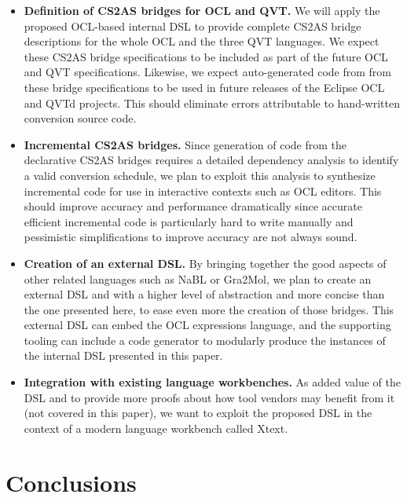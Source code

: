 \documentclass{llncs}
\begin{document}
\begin{itemize}
\item \textbf{Definition of CS2AS bridges for OCL and QVT.} We will apply the proposed OCL-based internal DSL to provide complete CS2AS bridge descriptions for the whole OCL and the three QVT languages. We expect these CS2AS bridge specifications to be included as part of the future OCL and QVT specifications. Likewise, we expect auto-generated code from from these bridge specifications to be used in future releases of the Eclipse OCL and QVTd projects. This should eliminate errors attributable to hand-written conversion source code.

\item \textbf{Incremental CS2AS bridges.} Since generation of code from the declarative CS2AS bridges requires a detailed dependency analysis to identify a valid conversion schedule, we plan to exploit this analysis to synthesize incremental code for use in interactive contexts such as OCL editors. This should improve accuracy and performance dramatically since accurate efficient incremental code is particularly hard to write manually and pessimistic simplifications to improve accuracy are not always sound.

\item \textbf{Creation of an external DSL.} By bringing together the good aspects of other related languages such as NaBL or Gra2Mol, we plan to create an external DSL and with a higher level of abstraction and more concise than the one presented here, to ease even more the creation of those bridges. This external DSL can embed the OCL expressions language, and the supporting tooling can include a code generator to modularly produce the instances of the internal DSL presented in this paper.

\item \textbf{Integration with existing language workbenches.} As added value of the DSL and to provide more proofs about how tool vendors may benefit from it (not covered in this paper), we want to exploit the proposed DSL in the context of a modern language workbench called Xtext.


\end{itemize}

\section{Conclusions}
\label{sec:conclusions}
\end{document}
